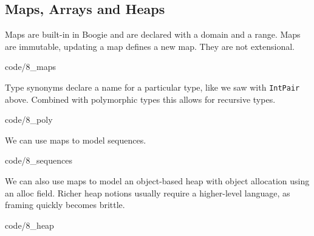 \subsection{Maps, Arrays and Heaps}
\begin{mytitle}[Maps] Maps are built-in in Boogie and are declared with a domain and a range. Maps are immutable, updating a map defines a new map. They are not extensional.
\end{mytitle}
 {code/8_maps}
\begin{mytitle} Type synonyms declare a name for a particular type, like we saw with \texttt{IntPair} above. Combined with polymorphic types this allows for recursive types.
\end{mytitle}
 {code/8_poly}
\begin{mytitle}[Sequences] We can use maps to model sequences.
\end{mytitle}
 {code/8_sequences}
\begin{mytitle} We can also use maps to model an object-based heap with object allocation using an alloc field. Richer heap notions usually require a higher-level language, as framing quickly becomes brittle.
\end{mytitle}
 {code/8_heap}

